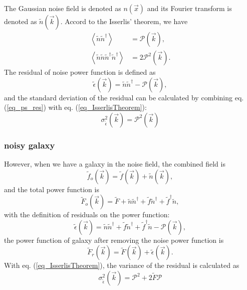 The Gaussian noise field is denoted as $n(\vec{x})$ and its Fourier transform
is denoted as $\tilde{n}(\vec{k})$. Accord to the Isserlis' theorem, we have
\begin{equation}\label{eq_IsserlisTheorem}
\begin{split}
    \left\langle\tilde{n}\tilde{n}^{\dagger}\right\rangle
    &=\mathcal{P}(\vec{k}),\\
    \left\langle\tilde{n}\tilde{n}\tilde{n}^\dagger\tilde{n}^\dagger\right\rangle
    &=2\mathcal{P}^2(\vec{k}).
\end{split}
\end{equation}
The residual of noise power function is defined as
\begin{equation}\label{eq_ps_res}
    \tilde{\epsilon}(\vec{k})=\tilde{n}\tilde{n}^\dagger
    -\mathcal{P}(\vec{k}),
\end{equation}
and the standard deviation of the residual can be calculated by combining
eq.(\ref{eq_ps_res}) with eq.  (\ref{eq_IsserlisTheorem}):
\begin{equation}
\sigma^2_{\tilde{\epsilon}}(\vec{k})=\mathcal{P}^2(\vec{k})
\end{equation}

\subsubsection{noisy galaxy}
However, when we have a galaxy in the noise field, the combined field is
\begin{equation}
    \tilde{f}_o(\vec{k})=\tilde{f}(\vec{k})+\tilde{n}(\vec{k}),
\end{equation}
and the total power function is
\begin{equation}
    \tilde{F}_o(\vec{k})= \tilde{F}+\tilde{n}\tilde{n}^\dagger
    +\tilde{f}\tilde{n}^{\dagger}+\tilde{f}^{\dagger}\tilde{n},
\end{equation}
with the definition of residuals on the power function:
\begin{equation}\label{eq_ps_res_gal}
    \tilde{\epsilon}(\vec{k})=\tilde{n}\tilde{n}^\dagger
    +\tilde{f}\tilde{n}^{\dagger}+\tilde{f}^{\dagger}\tilde{n}
    -\mathcal{P}(\vec{k}),
\end{equation}
the power function of galaxy after removing the noise power function is
\begin{equation}
    \tilde{F}_r(\vec{k})=\tilde{F}(\vec{k})+\tilde{\epsilon}(\vec{k}).
\end{equation}
With eq. (\ref{eq_IsserlisTheorem}), the variance of the residual is calculated
as
\begin{equation}\label{eq_var_res_noisyGal}
    \sigma^2_{\tilde{\epsilon}}(\vec{k})=\mathcal{P}^2+2\tilde{F}\mathcal{P}
\end{equation}

